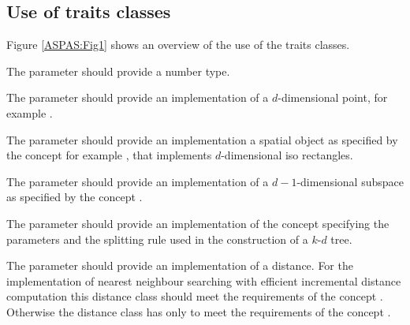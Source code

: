 








\subsection{Use of traits classes}

Figure \ref{ASPAS:Fig1} shows an overview of the use of the traits classes.

The parameter  should provide a number type.

The parameter  should provide an implementation of a $d$-dimensional point, 
for example .

The parameter  should provide an implementation a spatial object
as specified by the concept 
for example , that implements $d$-dimensional iso rectangles.

The parameter  should provide an implementation of a $d-1$-dimensional
subspace as specified by the concept .

The parameter  should provide an implementation of the concept 
specifying the parameters and the splitting rule used in the construction of a $k$-$d$ tree.

The parameter  should provide an implementation of a distance.
For the implementation of nearest neighbour searching with efficient incremental
distance computation this distance class should meet the requirements of the concept
. Otherwise the distance class has only to meet the
requirements of the concept .

